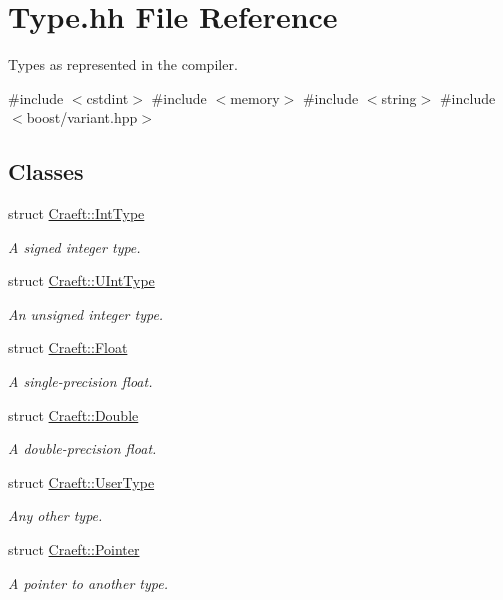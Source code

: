 \hypertarget{_type_8hh}{}\section{Type.\+hh File Reference}
\label{_type_8hh}


Types as represented in the compiler.  


{\ttfamily \#include $<$cstdint$>$}\newline
{\ttfamily \#include $<$memory$>$}\newline
{\ttfamily \#include $<$string$>$}\newline
{\ttfamily \#include $<$boost/variant.\+hpp$>$}\newline
\subsection*{Classes}
\begin{DoxyCompactItemize}
\item 
struct \hyperlink{struct_craeft_1_1_int_type}{Craeft\+::\+Int\+Type}
\begin{DoxyCompactList}\small\item\em A signed integer type. \end{DoxyCompactList}\item 
struct \hyperlink{struct_craeft_1_1_u_int_type}{Craeft\+::\+U\+Int\+Type}
\begin{DoxyCompactList}\small\item\em An unsigned integer type. \end{DoxyCompactList}\item 
struct \hyperlink{struct_craeft_1_1_float}{Craeft\+::\+Float}
\begin{DoxyCompactList}\small\item\em A single-\/precision float. \end{DoxyCompactList}\item 
struct \hyperlink{struct_craeft_1_1_double}{Craeft\+::\+Double}
\begin{DoxyCompactList}\small\item\em A double-\/precision float. \end{DoxyCompactList}\item 
struct \hyperlink{struct_craeft_1_1_user_type}{Craeft\+::\+User\+Type}
\begin{DoxyCompactList}\small\item\em Any other type. \end{DoxyCompactList}\item 
struct \hyperlink{struct_craeft_1_1_pointer}{Craeft\+::\+Pointer}
\begin{DoxyCompactList}\small\item\em A pointer to another type. \end{DoxyCompactList}\end{DoxyCompactItemize}
